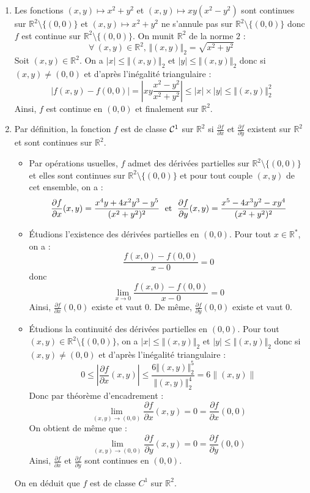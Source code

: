 \documentclass[a4paper,10pt]{report}
\begin{document}
 \begin{enumerate}
 \item Les fonctions $(x,y)\mapsto x^2+y^2$ et $(x,y)\mapsto xy(x^2-y^2)$ sont continues sur  $\mathbb{R}^2 \setminus \{(0,0)\}$ et $(x,y)\mapsto x^2+y^2$ ne s'annule pas sur $\mathbb{R}^2 \setminus \{(0,0)\}$ donc $f$ est continue sur $\mathbb{R}^2\setminus\{(0,0)\}$. On munit $\mathbb{R}^2$ de la norme $2$ :
$$\forall\:(x,y)\in\mathbb{R}^2, \,  \Vert (x,y) \Vert_2 = \sqrt{x^2+y^2}$$
Soit $(x,y)\in\mathbb{R}^2$. On a $|x|\leq \Vert (x,y) \Vert_2$ et $|y|\leq \Vert (x,y) \Vert_2$ donc si $(x,y) \neq (0,0)$ et d'après l'inégalité triangulaire :
$$|f(x,y)-f(0,0)|=\left|xy\frac{x^2-y^2}{x^2+y^2}\right| \leq |x| \times |y|\leq \Vert (x,y) \Vert_2^2$$
Ainsi, $f$ est continue en $(0,0)$ et finalement sur $\mathbb{R}^2$.
\item Par définition, la fonction $f$ est de classe ${\cal C}^1$ sur $\mathbb{R}^2$ si $\frac{\partial f}{\partial x}$ et $\frac{\partial f}{\partial y}$ existent sur $\mathbb{R}^2$ et sont continues sur $\mathbb{R}^2$.
\begin{itemize}
\item Par opérations usuelles, $f$ admet des dérivées partielles sur $\mathbb{R}^2 \setminus \{(0,0)\}$ et elles sont continues sur $\mathbb{R}^2 \setminus \{(0,0)\}$ et pour tout couple $(x,y)$ de cet ensemble, on a :
$$\dfrac{\partial f}{\partial x}(x,y)=\dfrac{x^4y+4x^2y^3-y^5}{(x^2+y^2)^{2}} \; \hbox{ et } \; \dfrac{\partial f}{\partial y}(x,y)=\dfrac{x^5-4x^3y^2-xy^4}{(x^2+y^2)^{2}}$$
\item Étudions l'existence des dérivées partielles en $(0,0)$. Pour tout $x\in\mathbb{R}^*$, on a :
$$\frac{f(x,0)-f(0,0)}{x-0}=0$$
donc 
$$\lim\limits_{x\rightarrow 0}\frac{f(x,0)-f(0,0)}{x-0}=0$$
Ainsi, $\frac{\partial f}{\partial x}(0,0)$ existe et vaut $0$. De même, $\frac{\partial f}{\partial y}(0,0)$ existe et vaut $0$.
\item Étudions la continuité des dérivées partielles en $(0,0)$. Pour tout $(x,y)\in \mathbb{R}^2 \setminus \{(0,0)\}$, on a $|x|\leq \Vert (x,y) \Vert_2$ et $|y|\leq \Vert (x,y) \Vert_2$ donc si $(x,y) \neq (0,0)$ et d'après l'inégalité triangulaire :
$$ 0 \leq \left|\dfrac{\partial f}{\partial x}(x,y)\right|\leq \dfrac{6\Vert (x,y) \Vert_2^5}{\Vert (x,y) \Vert_2^4}=6\|(x,y)\|$$ 
Donc par théorème d'encadrement :
$$\lim\limits_{(x,y)\to (0,0)}\frac{\partial f}{\partial x}(x,y)=0=\frac{\partial f}{\partial x}(0,0)$$
On obtient de même que :
$$\lim\limits_{(x,y)\to (0,0)}\frac{\partial f}{\partial y}(x,y)=0=\frac{\partial f}{\partial y}(0,0)$$
Ainsi, $\frac{\partial f}{\partial x}$ et $\frac{\partial f}{\partial y}$ sont continues en $(0,0)$.
\end{itemize}
On en déduit que $f$ est de classe $C^1$ sur $\mathbb{R}^2$.
 \end{enumerate}
\end{document}
